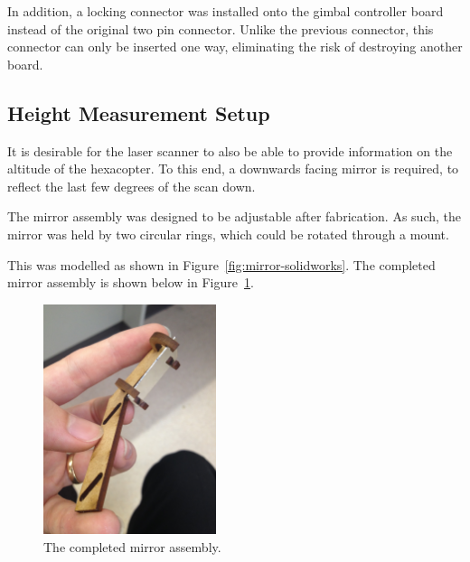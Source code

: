 \documentclass[12pt,oneside,a4paper]{book}
\begin{document}
In addition, a locking connector was installed onto the gimbal
controller board instead of the original two pin connector. Unlike the
previous connector, this connector can only be inserted one way,
eliminating the risk of destroying another board.

\subsection{Height Measurement Setup}
\label{sec:height-meas-setup}

It is desirable for the laser scanner to also be able to provide
information on the altitude of the hexacopter. To this end, a
downwards facing mirror is required, to reflect the last few degrees
of the scan down.

The mirror assembly was designed to be adjustable after
fabrication. As such, the mirror was held by two circular rings, which
could be rotated through a mount.

This was modelled as shown in Figure~\ref{fig:mirror-solidworks}. The
completed mirror assembly is shown below in Figure~\ref{fig:mirror}.

\begin{figure}[h]
  \centering
  \includegraphics[width=0.45\textwidth]{figs/mirror}
  \caption{The completed mirror assembly.}
  \label{fig:mirror}
\end{figure}
\end{document}
